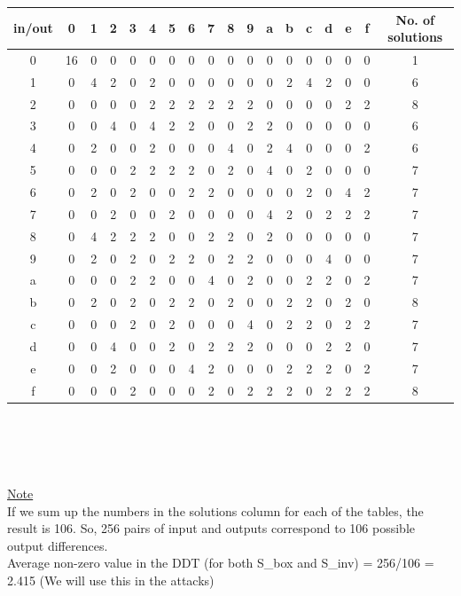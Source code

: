 \documentclass{transcrypto}
\begin{document}
\begin{tabular}{|c|c|c|c|c|c|c|c|c|c|c|c|c|c|c|c|c|c|}
\hline
in/out & 0 & 1 & 2 & 3 & 4 & 5 & 6 & 7 & 8 & 9 & a & b & c & d & e & f & No. of solutions \\
\hline
0 & 16 & 0 & 0 & 0 & 0 & 0 & 0 & 0 & 0 & 0 & 0 & 0 & 0 & 0 & 0 & 0 & 1 \\
\hline
1 & 0 & 4 & 2 & 0 & 2 & 0 & 0 & 0 & 0 & 0 & 0 & 2 & 4 & 2 & 0 & 0 & 6 \\
\hline
2 & 0 & 0 & 0 & 0 & 2 & 2 & 2 & 2 & 2 & 2 & 0 & 0 & 0 & 0 & 2 & 2 & 8 \\
\hline
3 & 0 & 0 & 4 & 0 & 4 & 2 & 2 & 0 & 0 & 2 & 2 & 0 & 0 & 0 & 0 & 0 & 6 \\
\hline
4 & 0 & 2 & 0 & 0 & 2 & 0 & 0 & 0 & 4 & 0 & 2 & 4 & 0 & 0 & 0 & 2 & 6 \\
\hline
5 & 0 & 0 & 0 & 2 & 2 & 2 & 2 & 0 & 2 & 0 & 4 & 0 & 2 & 0 & 0 & 0 & 7 \\
\hline
6 & 0 & 2 & 0 & 2 & 0 & 0 & 2 & 2 & 0 & 0 & 0 & 0 & 2 & 0 & 4 & 2 & 7 \\
\hline
7 & 0 & 0 & 2 & 0 & 0 & 2 & 0 & 0 & 0 & 0 & 4 & 2 & 0 & 2 & 2 & 2 & 7 \\
\hline
8 & 0 & 4 & 2 & 2 & 2 & 0 & 0 & 2 & 2 & 0 & 2 & 0 & 0 & 0 & 0 & 0 & 7 \\
\hline
9 & 0 & 2 & 0 & 2 & 0 & 2 & 2 & 0 & 2 & 2 & 0 & 0 & 0 & 4 & 0 & 0 & 7 \\
\hline
a & 0 & 0 & 0 & 2 & 2 & 0 & 0 & 4 & 0 & 2 & 0 & 0 & 2 & 2 & 0 & 2 & 7 \\
\hline
b & 0 & 2 & 0 & 2 & 0 & 2 & 2 & 0 & 2 & 0 & 0 & 2 & 2 & 0 & 2 & 0 & 8 \\
\hline
c & 0 & 0 & 0 & 2 & 0 & 2 & 0 & 0 & 0 & 4 & 0 & 2 & 2 & 0 & 2 & 2 & 7 \\
\hline
d & 0 & 0 & 4 & 0 & 0 & 2 & 0 & 2 & 2 & 2 & 0 & 0 & 0 & 2 & 2 & 0 & 7  \\
\hline
e & 0 & 0 & 2 & 0 & 0 & 0 & 4 & 2 & 0 & 0 & 0 & 2 & 2 & 2 & 0 & 2 & 7   \\
\hline
f & 0 & 0 & 0 & 2 & 0 & 0 & 0 & 2 & 0 & 2 & 2 & 2 & 0 & 2 & 2 & 2 & 8  \\
\hline
\end{tabular} \\ \\ \\ \\ 
\underline{Note} \\
If we sum up the numbers in the solutions column for each of the tables, the result is 106. So,  256 pairs of input and outputs correspond to 106 possible output differences. \\ 
Average non-zero value in the DDT (for both S\_box and S\_inv) = 256/106 = 2.415 (We will use this in the attacks) \\  
\end{document}
